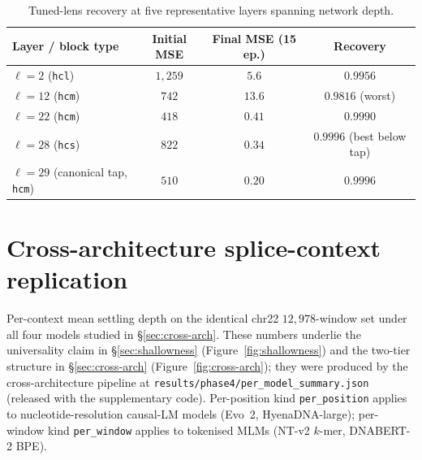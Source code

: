 \documentclass{article}
\theoremstyle{plain}
\theoremstyle{definition}
\theoremstyle{remark}
\begin{document}
\begin{table}[h]
\caption{Tuned-lens recovery at five representative layers spanning
network depth.}
\label{tab:tuned-lens}
\centering
\small
\begin{tabular}{@{}lccc@{}}
\toprule
Layer / block type & Initial MSE & Final MSE (15 ep.) & Recovery \\
\midrule
$\ell=2$ (\texttt{hcl}) & $1{,}259$ & $5.6$ & $0.9956$ \\
$\ell=12$ (\texttt{hcm}) & $742$ & $13.6$ & $0.9816$ (worst) \\
$\ell=22$ (\texttt{hcm}) & $418$ & $0.41$ & $0.9990$ \\
$\ell=28$ (\texttt{hcs}) & $822$ & $0.34$ & $0.9996$ (best below tap) \\
$\ell=29$ (canonical tap, \texttt{hcm}) & $510$ & $0.20$ & $0.9996$ \\
\bottomrule
\end{tabular}
\end{table}

\section{Cross-architecture splice-context replication}
\label{app:cross-arch}

Per-context mean settling depth on the identical chr22
$12{,}978$-window set under all four models studied in
\S\ref{sec:cross-arch}. These numbers underlie the universality claim
in \S\ref{sec:shallowness} (Figure~\ref{fig:shallowness}) and the two-tier
structure in \S\ref{sec:cross-arch} (Figure~\ref{fig:cross-arch}); they
were produced by the cross-architecture pipeline at
\texttt{results/phase4/per\_model\_summary.json} (released with the
supplementary code). Per-position kind \texttt{per\_position} applies
to nucleotide-resolution causal-LM models (Evo~2, HyenaDNA-large);
per-window kind \texttt{per\_window} applies to tokenised MLMs
(NT-v2 $k$-mer, DNABERT-2 BPE).
\end{document}
